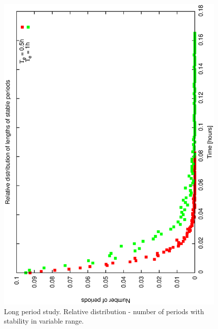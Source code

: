 \begin{figure}[h]
\begin{center}
 \includegraphics[scale=0.5, angle=-90]{figures/e_relstats.eps}
 \caption[Environmental scenario - relative distribution of stable period lengths.] 
   {Long period study. Relative distribution - number of periods with stability in variable range.}
\label{fig:env_relstats}
\end{center} 
\end{figure}

